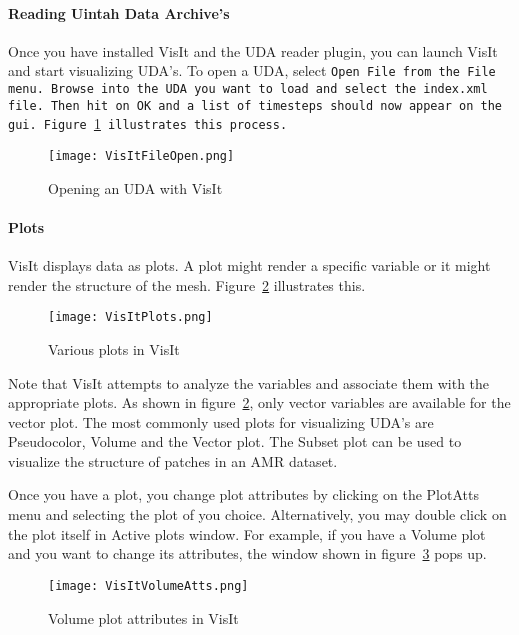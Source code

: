 \paragraph{Reading Uintah Data Archive's}

Once you have installed VisIt and the UDA reader plugin, you can launch VisIt and start visualizing UDA's. To open a UDA, select \tt Open File \normalfont from the \tt  File \normalfont menu. Browse into the UDA you want to load and select the \tt index.xml \normalfont file. Then hit on \tt OK \normalfont and a list of timesteps should now appear on the gui. Figure~\ref{VisItFileOpen} illustrates this process.

\begin{figure}
  \center
  \texttt{[image: VisItFileOpen.png]}
  \caption{Opening an UDA with VisIt}
  \label{VisItFileOpen}
\end{figure}

\paragraph{Plots}

VisIt displays data as plots. A plot might render a specific variable or it might render the structure of the mesh. Figure~\ref{VisItPlots} illustrates this.

\begin{figure}
  \center
  \texttt{[image: VisItPlots.png]}
  \caption{Various plots in VisIt}
  \label{VisItPlots}
\end{figure}

Note that VisIt attempts to analyze the variables and associate them with the appropriate plots. As shown in figure~\ref{VisItPlots}, only vector variables are available for the vector plot. The most commonly used plots for visualizing UDA's are Pseudocolor, Volume and the Vector plot. The Subset plot can be used to visualize the structure of patches in an AMR dataset. %

Once you have a plot, you change plot attributes by clicking on the PlotAtts menu and selecting the plot of you choice. Alternatively, you may double click on the plot itself in Active plots window. For example, if you have a Volume plot and you want to change its attributes, the window shown in figure~\ref{VisItVolumeAtts} pops up.

\begin{figure}
  \center
  \texttt{[image: VisItVolumeAtts.png]}
  \caption{Volume plot attributes in VisIt}
  \label{VisItVolumeAtts}
\end{figure}

